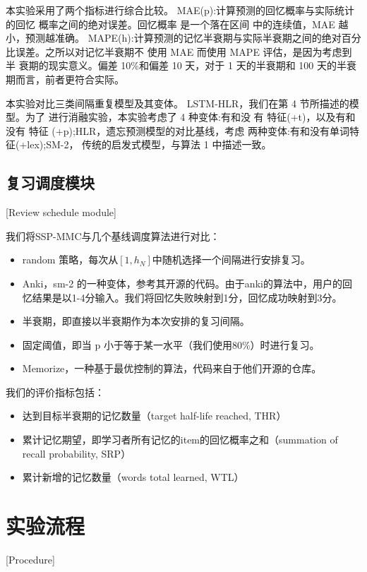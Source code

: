 本实验采用了两个指标进行综合比较。 MAE(p):计算预测的回忆概率与实际统计的回忆 概率之间的绝对误差。回忆概率 是一个落在区间 中的连续值，MAE 越小，预测越准确。 MAPE(h):计算预测的记忆半衰期与实际半衰期之间的绝对百分比误差。之所以对记忆半衰期不 使用 MAE 而使用 MAPE 评估，是因为考虑到半 衰期的现实意义。偏差 10\%和偏差 10 天，对于 1 天的半衰期和 100 天的半衰期而言，前者更符合实际。

本实验对比三类间隔重复模型及其变体。 LSTM-HLR，我们在第 4 节所描述的模型。为了 进行消融实验，本实验考虑了 4 种变体:有和没 有 特征(+t)，以及有和没有 特征 (+p);HLR，遗忘预测模型的对比基线，考虑 两种变体:有和没有单词特征(+lex);SM-2， 传统的启发式模型，与算法 1 中描述一致。

\subsection{复习调度模块}[Review schedule module]

我们将SSP-MMC与几个基线调度算法进行对比：

\begin{itemize}
    \item random 策略，每次从$[1,h_N]$中随机选择一个间隔进行安排复习。
    \item Anki，sm-2 的一种变体，参考其开源的代码。由于anki的算法中，用户的回忆结果是以1-4分输入。我们将回忆失败映射到1分，回忆成功映射到3分。
    \item 半衰期，即直接以半衰期作为本次安排的复习间隔。
    \item 固定阈值，即当 p 小于等于某一水平（我们使用80\%）时进行复习。
    \item Memorize，一种基于最优控制的算法，代码来自于他们开源的仓库。
\end{itemize}

我们的评价指标包括：

\begin{itemize}
    \item 达到目标半衰期的记忆数量（target half-life reached, THR）
    \item 累计记忆期望，即学习者所有记忆的item的回忆概率之和（summation of recall probability, SRP）
    \item 累计新增的记忆数量（words total learned, WTL）
\end{itemize}

\section{实验流程}[Procedure]

